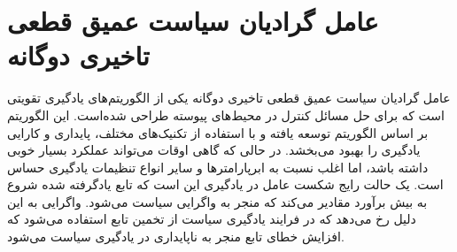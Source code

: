 \section{عامل گرادیان سیاست عمیق قطعی تاخیری دوگانه}
عامل گرادیان سیاست عمیق قطعی تاخیری دوگانه
 یکی از الگوریتم‌های یادگیری تقویتی است که برای حل مسائل کنترل در محیط‌های پیوسته طراحی شده‌است. این الگوریتم بر اساس الگوریتم  توسعه یافته و با استفاده از تکنیک‌های مختلف، پایداری و کارایی یادگیری را بهبود می‌بخشد.
 در حالی که  گاهی اوقات می‌تواند عملکرد بسیار خوبی داشته باشد، اما اغلب نسبت به ابرپارامترها و سایر انواع تنظیمات یادگیری حساس است.
  یک حالت رایج شکست عامل  در یادگیری این است که تابع  یادگرفته شده شروع به بیش برآورد مقادیر  می‌کند که منجر به واگرایی سیاست می‌شود. واگرایی به این دلیل رخ می‌دهد که در فرایند یادگیری سیاست از تخمین تابع 
 استفاده می‌شود که افزایش خطای تابع  منجر به ناپایداری در یادگیری سیاست می‌شود.
 
